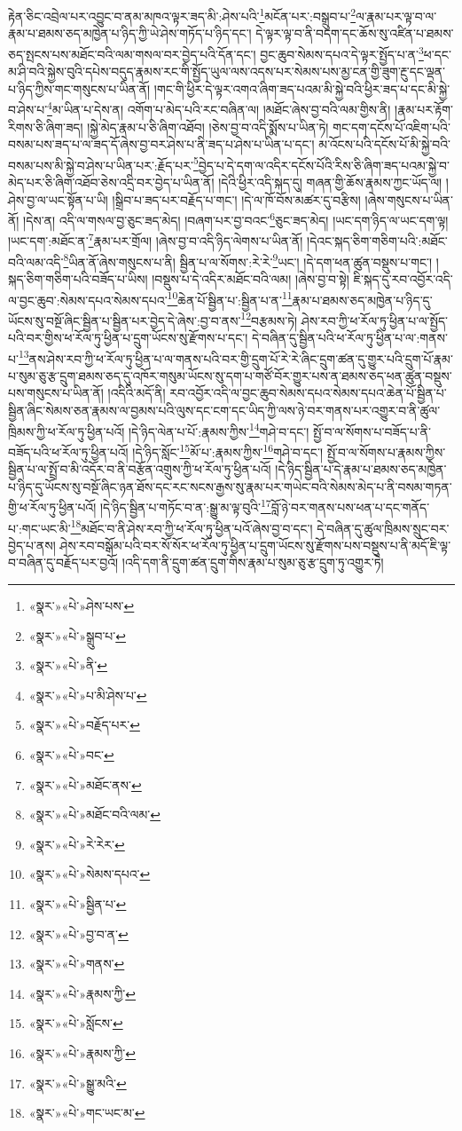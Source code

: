 རྟེན་ཅིང་འབྲེལ་པར་འབྱུང་བ་ནམ་མཁའ་ལྟར་ཟད་མི་:ཤེས་པའི་\footnote{«སྣར་»«པེ་»ཤེས་པས་}མངོན་པར་:བསྒྲུབ་པ་\footnote{«སྣར་»«པེ་»སྒྲུབ་པ་}ལ་རྣམ་པར་ལྟ་བ་ལ་རྣམ་པ་ཐམས་ཅད་མཁྱེན་པ་ཉིད་ཀྱི་ཡེ་ཤེས་གཏོད་པ་ཉིད་དང་། དེ་ལྟར་ལྟ་བ་ནི་བདག་དང་ཆོས་སུ་འཛིན་པ་ཐམས་ཅད་སྤངས་པས་མཐོང་བའི་ལམ་གསལ་བར་བྱེད་པའི་དོན་དང་། བྱང་ཆུབ་སེམས་དཔའ་དེ་ལྟར་སྤྱོད་པ་ན་\footnote{«སྣར་»«པེ་»ནི་}ཕ་དང་མ་ཤི་བའི་སྐྱེས་བུའི་དཔེས་བདུད་རྣམས་རང་གི་སྤྱོད་ཡུལ་ལས་འདས་པར་སེམས་པས་མྱ་ངན་གྱི་ཟུག་རྔུ་དང་ལྡན་པ་ཉིད་ཀྱིས་གང་གསུངས་པ་ཡིན་ནོ། །གང་གི་ཕྱིར་དེ་ལྟར་འགའ་ཞིག་ཟད་པའམ་མི་སྐྱེ་བའི་ཕྱིར་ཟད་པ་དང་མི་སྐྱེ་བ་ཤེས་པ་\footnote{«སྣར་»«པེ་»པ་མི་ཤེས་པ་}མ་ཡིན་པ་དེས་ན། འགོག་པ་མེད་པའི་རང་བཞིན་ལ། །མཐོང་ཞེས་བྱ་བའི་ལམ་གྱིས་ནི། །རྣམ་པར་རྟོག་རིགས་ཅི་ཞིག་ཟད། །སྐྱེ་མེད་རྣམ་པ་ཅི་ཞིག་འཐོབ། །ཅེས་བྱ་བ་འདི་སྨོས་པ་ཡིན་ཏེ། གང་དག་དངོས་པོ་འཇིག་པའི་བསམ་པས་ཟད་པ་ལ་ཟད་དོ་ཞེས་བྱ་བར་ཤེས་པ་ནི་ཟད་པ་ཤེས་པ་ཡིན་པ་དང་། མ་འོངས་པའི་དངོས་པོ་མི་སྐྱེ་བའི་བསམ་པས་མི་སྐྱེ་བ་ཤེས་པ་ཡིན་པར་:རྗོད་པར་\footnote{«སྣར་»«པེ་»བརྗོད་པར་}བྱེད་པ་དེ་དག་ལ་འདིར་དངོས་པོའི་རིས་ཅི་ཞིག་ཟད་པའམ་སྐྱེ་བ་མེད་པར་ཅི་ཞིག་འཐོབ་ཅེས་འདྲི་བར་བྱེད་པ་ཡིན་ནོ། །དེའི་ཕྱིར་འདི་སྐད་དུ། གཞན་གྱི་ཆོས་རྣམས་ཀྱང་ཡོད་ལ། །ཤེས་བྱ་ལ་ཡང་སྟོན་པ་ཡི། །སྒྲིབ་པ་ཟད་པར་བརྗོད་པ་གང་། །དེ་ལ་ཁོ་བོས་མཚར་དུ་བརྩིས། །ཞེས་གསུངས་པ་ཡིན་ནོ། །དེས་ན། འདི་ལ་གསལ་བྱ་ཅུང་ཟད་མེད། །བཞག་པར་བྱ་བའང་\footnote{«སྣར་»«པེ་»བང་}ཅུང་ཟད་མེད། །ཡང་དག་ཉིད་ལ་ཡང་དག་ལྟ། །ཡང་དག་:མཐོང་ན་\footnote{«སྣར་»«པེ་»མཐོང་ནས་}རྣམ་པར་གྲོལ། །ཞེས་བྱ་བ་འདི་ཉིད་ལེགས་པ་ཡིན་ནོ། །དེའང་སྐད་ཅིག་གཅིག་པའི་:མཐོང་བའི་ལམ་འདི་\footnote{«སྣར་»«པེ་»མཐོང་བའི་ལམ་}ཡིན་ནོ་ཞེས་གསུངས་པ་ནི། སྦྱིན་པ་ལ་སོགས་:རེ་རེ་\footnote{«སྣར་»«པེ་»རེ་རེར་}ཡང་། །དེ་དག་ཕན་ཚུན་བསྡུས་པ་གང་། །སྐད་ཅིག་གཅིག་པའི་བཟོད་པ་ཡིས། །བསྡུས་པ་དེ་འདིར་མཐོང་བའི་ལམ། །ཞེས་བྱ་བ་སྟེ། ཇི་སྐད་དུ་རབ་འབྱོར་འདི་ལ་བྱང་ཆུབ་:སེམས་དཔའ་སེམས་དཔའ་\footnote{«སྣར་»«པེ་»སེམས་དཔའ་}ཆེན་པོ་སྦྱིན་པ་:སྦྱིན་པ་ན་\footnote{«སྣར་»«པེ་»སྦྱིན་པ་}རྣམ་པ་ཐམས་ཅད་མཁྱེན་པ་ཉིད་དུ་ཡོངས་སུ་བསྔོ་ཞིང་སྦྱིན་པ་སྦྱིན་པར་བྱེད་དེ་ཞེས་:བྱ་བ་ནས་\footnote{«སྣར་»«པེ་»བྱ་བ་ན་}བརྩམས་ཏེ། ཤེས་རབ་ཀྱི་ཕ་རོལ་ཏུ་ཕྱིན་པ་ལ་སྤྱོད་པའི་བར་གྱིས་ཕ་རོལ་ཏུ་ཕྱིན་པ་དྲུག་ཡོངས་སུ་རྫོགས་པ་དང་། དེ་བཞིན་དུ་སྦྱིན་པའི་ཕ་རོལ་ཏུ་ཕྱིན་པ་ལ་:གནས་པ་\footnote{«སྣར་»«པེ་»གནས་}ནས་ཤེས་རབ་ཀྱི་ཕ་རོལ་ཏུ་ཕྱིན་པ་ལ་གནས་པའི་བར་གྱི་དྲུག་པོ་རེ་རེ་ཞིང་དྲུག་ཚན་དུ་གྱུར་པའི་དྲུག་པོ་རྣམ་པ་སུམ་ཅུ་རྩ་དྲུག་ཐམས་ཅད་དུ་འཁོར་གསུམ་ཡོངས་སུ་དག་པ་གཙོ་བོར་གྱུར་པས་ན་ཐམས་ཅད་ཕན་ཚུན་བསྡུས་པས་གསུངས་པ་ཡིན་ནོ། །འདིའི་མདོ་ནི། རབ་འབྱོར་འདི་ལ་བྱང་ཆུབ་སེམས་དཔའ་སེམས་དཔའ་ཆེན་པོ་སྦྱིན་པ་སྦྱིན་ཞིང་སེམས་ཅན་རྣམས་ལ་བྱམས་པའི་ལུས་དང་ངག་དང་ཡིད་ཀྱི་ལས་ཉེ་བར་གནས་པར་འགྱུར་བ་ནི་ཚུལ་ཁྲིམས་ཀྱི་ཕ་རོལ་ཏུ་ཕྱིན་པའོ། །དེ་ཉིད་ལེན་པ་པོ་:རྣམས་ཀྱིས་\footnote{«སྣར་»«པེ་»རྣམས་ཀྱི་}གཤེ་བ་དང་། སྤྱོ་བ་ལ་སོགས་པ་བཟོད་པ་ནི་བཟོད་པའི་ཕ་རོལ་ཏུ་ཕྱིན་པའོ། །དེ་ཉིད་སློང་\footnote{«སྣར་»«པེ་»སློངས་}མོ་པ་:རྣམས་ཀྱིས་\footnote{«སྣར་»«པེ་»རྣམས་ཀྱི་}གཤེ་བ་དང་། སྤྱོ་བ་ལ་སོགས་པ་རྣམས་ཀྱིས་སྦྱིན་པ་ལ་སྤྲོ་བ་མི་འདོར་བ་ནི་བརྩོན་འགྲུས་ཀྱི་ཕ་རོལ་ཏུ་ཕྱིན་པའོ། །དེ་ཉིད་སྦྱིན་པ་དེ་རྣམ་པ་ཐམས་ཅད་མཁྱེན་པ་ཉིད་དུ་ཡོངས་སུ་བསྔོ་ཞིང་ཉན་ཐོས་དང་རང་སངས་རྒྱས་སུ་རྣམ་པར་གཡེང་བའི་སེམས་མེད་པ་ནི་བསམ་གཏན་གྱི་ཕ་རོལ་ཏུ་ཕྱིན་པའོ། །དེ་ཉིད་སྦྱིན་པ་གཏོང་བ་ན་:སྒྱུ་མ་ལྟ་བུའི་\footnote{«སྣར་»«པེ་»སྒྱུ་མའི་}བློ་ཉེ་བར་གནས་པས་ཕན་པ་དང་གནོད་པ་:གང་ཡང་མི་\footnote{«སྣར་»«པེ་»གང་ཡང་མ་}མཐོང་བ་ནི་ཤེས་རབ་ཀྱི་ཕ་རོལ་ཏུ་ཕྱིན་པའོ་ཞེས་བྱ་བ་དང་། དེ་བཞིན་དུ་ཚུལ་ཁྲིམས་སྲུང་བར་བྱེད་པ་ནས། ཤེས་རབ་བསྒོམ་པའི་བར་སོ་སོར་ཕ་རོལ་ཏུ་ཕྱིན་པ་དྲུག་ཡོངས་སུ་རྫོགས་པས་བསྡུས་པ་ནི་མདོ་ཇི་ལྟ་བ་བཞིན་དུ་བརྗོད་པར་བྱའོ། །འདི་དག་ནི་དྲུག་ཚན་དྲུག་གིས་རྣམ་པ་སུམ་ཅུ་རྩ་དྲུག་ཏུ་འགྱུར་ཏེ། 